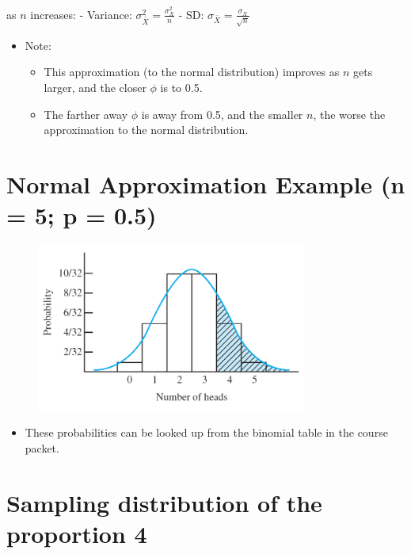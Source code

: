 \documentclass[12pt]{article}
\begin{document}
as \(n\) increases: - Variance:
\(\sigma_{\bar{X}}^{2} = \frac{\sigma_{X}^2}{n}\) - SD:
\(\sigma_{\bar{X}} = \frac{\sigma_{X}}{\sqrt{n}}\)

\begin{itemize}
\itemsep1pt\parskip0pt
\item
  Note:

  \begin{itemize}
  \itemsep1pt\parskip0pt
  \item
    This approximation (to the normal distribution) improves as \(n\)
    gets larger, and the closer \(\phi\) is to 0.5.
  \item
    The farther away \(\phi\) is away from 0.5, and the smaller \(n\),
    the worse the approximation to the normal distribution.
  \end{itemize}
\end{itemize}

\section{Normal Approximation Example (n = 5; p =
0.5)}\label{normal-approximation-example-n-5-p-0.5}

\begin{figure}[H]
\centering
\includegraphics[width=3.5in]{binom_norm_approx.png}
\caption{}
\end{figure}

\begin{itemize}
\itemsep1pt\parskip0pt
\item
  These probabilities can be looked up from the binomial table in the
  course packet.
\end{itemize}

\section{Sampling distribution of the proportion
4}\label{sampling-distribution-of-the-proportion-4}
\end{document}

